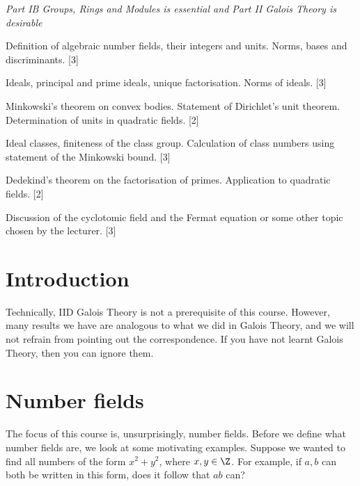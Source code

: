 \documentclass[a4paper]{article}
\begin{document}
\maketitle
{\small
\noindent\emph{Part IB Groups, Rings and Modules is essential and Part II Galois Theory is desirable}
\vspace{10pt}

\noindent Definition of algebraic number fields, their integers and units. Norms, bases and discriminants.\hspace*{\fill} [3]

\vspace{5pt}
\noindent Ideals, principal and prime ideals, unique factorisation. Norms of ideals.\hspace*{\fill} [3]

\vspace{5pt}
\noindent Minkowski's theorem on convex bodies. Statement of Dirichlet's unit theorem. Determination of units in quadratic fields.\hspace*{\fill} [2]

\vspace{5pt}
\noindent Ideal classes, finiteness of the class group. Calculation of class numbers using statement of the Minkowski bound.\hspace*{\fill} [3]

\vspace{5pt}
\noindent Dedekind's theorem on the factorisation of primes. Application to quadratic fields.\hspace*{\fill} [2]

\vspace{5pt}
\noindent Discussion of the cyclotomic field and the Fermat equation or some other topic chosen by the lecturer.\hspace*{\fill} [3]}

\tableofcontents
\setcounter{section}{-1}
\section{Introduction}
Technically, IID Galois Theory is not a prerequisite of this course. However, many results we have are analogous to what we did in Galois Theory, and we will not refrain from pointing out the correspondence. If you have not learnt Galois Theory, then you can ignore them.

\section{Number fields}
The focus of this course is, unsurprisingly, number fields. Before we define what number fields are, we look at some motivating examples. Suppose we wanted to find all numbers of the form $x^2 + y^2$, where $x, y \in \Z$. For example, if $a, b$ can both be written in this form, does it follow that $ab$ can?
\end{document}
